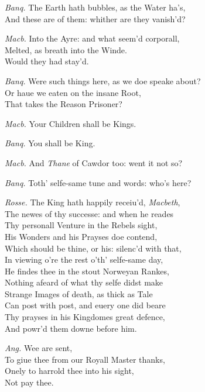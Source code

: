 \documentclass[12pt]{sides}
\newcommand{\dia}[1]{\hskip 10pt\textit{#1}\hskip 6pt}
\begin{document}
\begin{multicols}{2}
            \dia{Banq.} The Earth hath bubbles, as the Water ha's, \\ And these are of them: whither are they vanish'd?
            
            \dia{Macb.} Into the Ayre: and what seem'd corporall, \\ Melted, as breath into the Winde. \\ Would they had stay'd.

            \dia{Banq.} Were such things here, as we doe speake about? \\ Or haue we eaten on the insane Root, \\ That takes the Reason Prisoner?
            
            \dia{Macb.} Your Children shall be Kings.
            
            \dia{Banq.} You shall be King.
            
            \dia{Macb.} And \textit{Thane} of Cawdor too: went it not so?

            \dia{Banq.} Toth' selfe-same tune and words: who's here?


            \dia{Rosse.} The King hath happily receiu'd, \textit{Macbeth}, \\ The newes of thy successe: and when he reades \\ Thy personall Venture in the Rebels sight, \\ His Wonders and his Prayses doe contend, \\ Which should be thine, or his: silenc'd with that, \\ In viewing o're the rest o'th' selfe-same day, \\ He findes thee in the stout Norweyan Rankes, \\ Nothing afeard of what thy selfe didst make \\ Strange Images of death, as thick as Tale \\ Can post with post, and euery one did beare \\ Thy prayses in his Kingdomes great defence, \\ And powr'd them downe before him.

            \dia{Ang.} Wee are sent, \\ To giue thee from our Royall Master thanks, \\ Onely to harrold thee into his sight, \\ Not pay thee.


\end{multicols}
\end{document}
